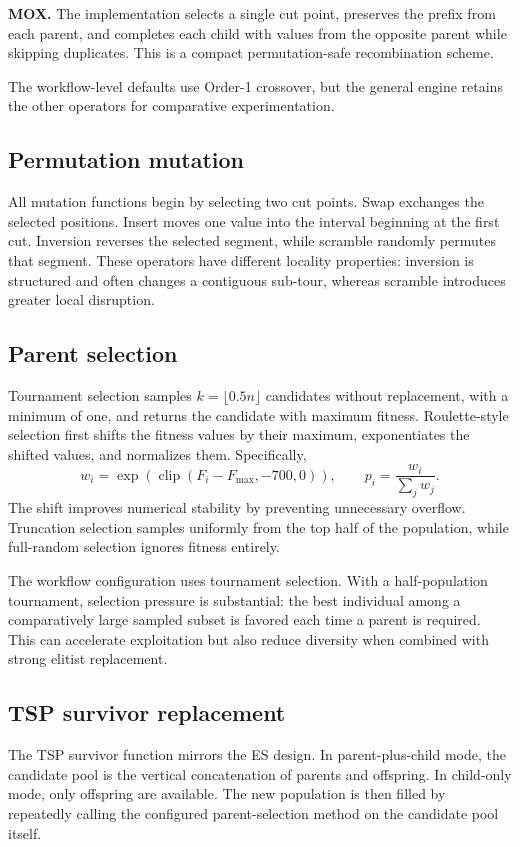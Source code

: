 \documentclass[11pt,a4paper]{article}
\begin{document}
\textbf{MOX.} The implementation selects a single cut point, preserves the prefix from each parent, and completes each child with values from the opposite parent while skipping duplicates. This is a compact permutation-safe recombination scheme.

The workflow-level defaults use Order-1 crossover, but the general engine retains the other operators for comparative experimentation.

\subsection{Permutation mutation}
All mutation functions begin by selecting two cut points. Swap exchanges the selected positions. Insert moves one value into the interval beginning at the first cut. Inversion reverses the selected segment, while scramble randomly permutes that segment. These operators have different locality properties: inversion is structured and often changes a contiguous sub-tour, whereas scramble introduces greater local disruption.

\subsection{Parent selection}
Tournament selection samples $k=\lfloor 0.5n\rfloor$ candidates without replacement, with a minimum of one, and returns the candidate with maximum fitness. Roulette-style selection first shifts the fitness values by their maximum, exponentiates the shifted values, and normalizes them. Specifically,
\begin{equation}
w_i=\exp\left(\operatorname{clip}(F_i-F_{\max},-700,0)\right),
\qquad
p_i=\frac{w_i}{\sum_j w_j}.
\end{equation}
The shift improves numerical stability by preventing unnecessary overflow. Truncation selection samples uniformly from the top half of the population, while full-random selection ignores fitness entirely.

The workflow configuration uses tournament selection. With a half-population tournament, selection pressure is substantial: the best individual among a comparatively large sampled subset is favored each time a parent is required. This can accelerate exploitation but also reduce diversity when combined with strong elitist replacement.

\subsection{TSP survivor replacement}
The TSP survivor function mirrors the ES design. In parent-plus-child mode, the candidate pool is the vertical concatenation of parents and offspring. In child-only mode, only offspring are available. The new population is then filled by repeatedly calling the configured parent-selection method on the candidate pool itself.
\end{document}
